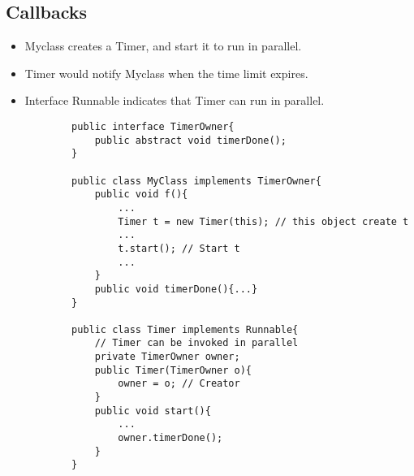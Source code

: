 \documentclass[a4paper]{article}
\begin{document}
\subsection{Callbacks}
\begin{itemize}
    \item Myclass creates a Timer, and start it to run in parallel.
    \item Timer would notify Myclass when the time limit expires.
    \item Interface Runnable indicates that Timer can run in parallel.
    \begin{lstlisting}
        public interface TimerOwner{
            public abstract void timerDone();
        }

        public class MyClass implements TimerOwner{
            public void f(){
                ...
                Timer t = new Timer(this); // this object create t
                ...
                t.start(); // Start t
                ...
            }
            public void timerDone(){...}
        }

        public class Timer implements Runnable{
            // Timer can be invoked in parallel
            private TimerOwner owner;
            public Timer(TimerOwner o){
                owner = o; // Creator
            }
            public void start(){
                ...
                owner.timerDone();
            }
        }
    \end{lstlisting}
\end{itemize}
\end{document}
